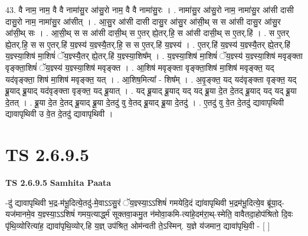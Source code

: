 \documentclass[17pt]{extarticle}
\begin{document}
43. वै नाम॒ नाम॒ वै वै नामा॑सु॒र आ॑सु॒रो नाम॒ वै वै नामा॑सु॒रः । . नामा॑सु॒र आ॑सु॒रो नाम॒ नामा॑सु॒र आ॑सी दासी दासु॒रो नाम॒ नामा॑सु॒र आ॑सीत् । . आ॒सु॒र आ॑सी दासी दासु॒र आ॑सु॒र आ॑सी॒थ् स स आ॑सी दासु॒र आ॑सु॒र आ॑सी॒थ् सः । . आ॒सी॒थ् स स आ॑सी दासी॒थ् स ए॒तर् ह्ये॒तर्.हि॒ स आ॑सी दासी॒थ् स ए॒तर्.हि॑ । . स ए॒तर् ह्ये॒तर्.हि॒ स स ए॒तर्.हि॑ य॒ज्ञ्स्य॑ य॒ज्ञ्स्यै॒तर्.हि॒ स स ए॒तर्.हि॑ य॒ज्ञ्स्य॑ । . ए॒तर्.हि॑ य॒ज्ञ्स्य॑ य॒ज्ञ्स्यै॒तर् ह्ये॒तर्.हि॑ य॒ज्ञ्स्या॒शिष॑ मा॒शिषं॑ ॅय॒ज्ञ्स्यै॒तर् ह्ये॒तर्.हि॑ य॒ज्ञ्स्या॒शिष᳚म् । . य॒ज्ञ्स्या॒शिष॑ मा॒शिषं॑ ॅय॒ज्ञ्स्य॑ य॒ज्ञ्स्या॒शिष॑ मवृङ्क्ता वृङ्क्ता॒शिषं॑ ॅय॒ज्ञ्स्य॑ य॒ज्ञ्स्या॒शिष॑ मवृङ्क्त । . आ॒शिष॑ मवृङ्क्ता वृङ्क्ता॒शिष॑ मा॒शिष॑ मवृङ्क्त॒ यद् यद॑वृङ्क्ता॒ शिष॑ मा॒शिष॑ मवृङ्क्त॒ यत् । . आ॒शिष॒मित्या᳚ - शिष᳚म् । . अ॒वृ॒ङ्क्त॒ यद् यद॑वृङ्क्ता वृङ्क्त॒ यद् ब्रू॒याद् ब्रू॒याद् यद॑वृङ्क्ता वृङ्क्त॒ यद् ब्रू॒यात् । . यद् ब्रू॒याद् ब्रू॒याद् यद् यद् ब्रू॒या दे॒त दे॒तद् ब्रू॒याद् यद् यद् ब्रू॒या दे॒तत् । . ब्रू॒या दे॒त दे॒तद् ब्रू॒याद् ब्रू॒या दे॒तदु॑ वु वे॒तद् ब्रू॒याद् ब्रू॒या दे॒तदु॑ । . ए॒तदु॑ वु वे॒त दे॒तदु॑ द्यावापृथिवी द्यावापृथिवी उ वे॒त दे॒तदु॑ द्यावापृथिवी । \newline
\pagebreak
{}
\section*{ TS 2.6.9.5 }

\textbf{TS 2.6.9.5 } \newline
\textbf{Samhita Paata} \newline

-दु॑ द्यावापृथिवी भ॒द्र-म॑भू॒दित्ये॒तदु॑-मे॒वाऽऽसु॒रं ॅय॒ज्ञ्स्या॒ऽऽशिषं॑ गमयेदि॒दं द्या॑वापृथिवी भ॒द्रम॑भू॒दित्ये॒व ब्रू॑या॒द्-यज॑मानमे॒व य॒ज्ञ्स्या॒ऽऽशिषं॑ गमय॒त्यार्द्ध्म॑ सूक्तवा॒कमु॒त न॑मोवा॒कमि-त्या॑हे॒दम॑रा॒थ्-स्मेति॒ वावैतदा॒होप॑श्रितो दि॒वः पृ॑थि॒व्योरित्या॑ह॒ द्यावा॑पृथि॒व्योर्.हि य॒ज्ञ् उप॑श्रित॒ ओम॑न्वती ते॒ऽस्मिन्. य॒ज्ञे य॑जमान॒ द्यावा॑पृथि॒वी - [  ] \newline
\end{document}
